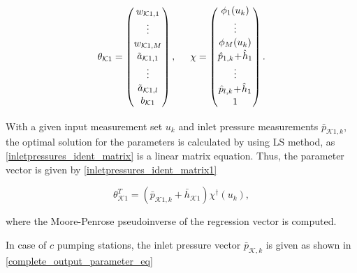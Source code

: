   \begin{equation}
\label{par_regr_matrix}
\theta_{\mathcal{K}1} = 
          \begin{pmatrix}
           w_{\mathcal{K}1,1}  \\[1pt]
           \vdots  \\[1pt]
           w_{\mathcal{K}1,M}  \\[1pt]
           \tilde{a}_{\mathcal{K}1,1} \\[1pt]
           \vdots \\[1pt]
           \tilde{a}_{\mathcal{K}1,l} \\[1pt]
           b_{\mathcal{K}1} \\[1pt]
         \end{pmatrix}
         ,
         \hspace{5mm}
         \chi = 
         \begin{pmatrix}
           \phi_{1}(u_k)  \\[1pt]
           \vdots  \\[1pt]
           \phi_{M}(u_k)  \\[1pt]
           \hat{p}_{1,k} \!+ \!\hat{h}_1 \\[1pt]
           \vdots  \\[1pt]
           \hat{p}_{l,k} \!+ \!\hat{h}_1 \\[1pt]
           1 \\[1pt]
         \end{pmatrix}.
\end{equation}

With a given input measurement set $u_k$ and inlet pressure measurements $\bar{p}_{\mathcal{K}1,k}$, the optimal solution for the parameters is calculated by using LS method, as \eqref{inletpressures_ident_matrix} is a linear matrix equation. Thus, the parameter vector is given by \eqref{inletpressures_ident_matrix1}

  \begin{equation}
\label{inletpressures_ident_matrix1}
 \theta^T_{\mathcal{K}1} = (\bar{p}_{\mathcal{K}1,k} + \bar{h}_{\mathcal{K}1}) \chi^{\dagger}(u_k), 
\end{equation}

where the Moore-Penrose pseudoinverse of the regression vector is computed.  

\newpage

In case of $c$ pumping stations, the inlet pressure vector $\bar{p}_{\mathcal{K},k}$ is given as shown in \eqref{complete_output_parameter_eq}


